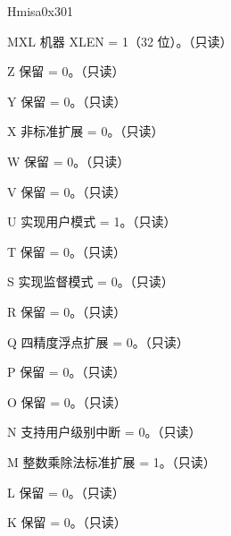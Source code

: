 \begin{register}{H}{misa}{0x301}\label{regdesc:MISA}
%
%
%
%
%
%
%
%
%
%
%
%
%
%
%
%
%
%
%
%
%
%
%
%
%
%
%
%
\regnewline%
\begin{regdesc}\begin{reglist}
\label{fielddesc:MISAMXL}\item [MXL] 机器 XLEN = 1（32 位）。（只读）
\label{fielddesc:MISAZ}\item [Z] 保留 = 0。（只读）
\label{fielddesc:MISAY}\item [Y] 保留 = 0。（只读）
\label{fielddesc:MISAX}\item [X] 非标准扩展 = 0。（只读）
\label{fielddesc:MISAW}\item [W] 保留 = 0。（只读）
\label{fielddesc:MISAV}\item [V] 保留 = 0。（只读）
\label{fielddesc:MISAU}\item [U] 实现用户模式 = 1。（只读）
\label{fielddesc:MISAT}\item [T] 保留 = 0。（只读）
\label{fielddesc:MISAS}\item [S] 实现监督模式 = 0。（只读）
\label{fielddesc:MISAR}\item [R] 保留 = 0。（只读）
\label{fielddesc:MISAQ}\item [Q] 四精度浮点扩展 = 0。（只读）
\label{fielddesc:MISAP}\item [P] 保留 = 0。（只读）
\label{fielddesc:MISAO}\item [O] 保留 = 0。（只读）
\label{fielddesc:MISAN}\item [N] 支持用户级别中断 = 0。（只读）
\label{fielddesc:MISAM}\item [M] 整数乘除法标准扩展 = 1。（只读）
\label{fielddesc:MISAL}\item [L] 保留 = 0。（只读）
\label{fielddesc:MISAK}\item [K] 保留 = 0。（只读）

\end{reglist}
\end{regdesc}
\end{register}
